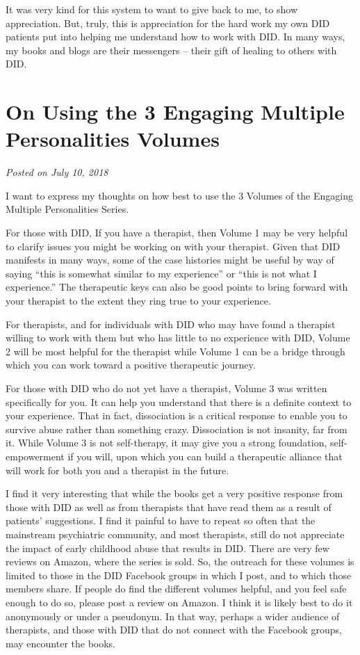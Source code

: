 \documentclass[]{book}
\begin{document}
It was very kind for this system to want to give back to me, to show appreciation. But, truly, this is appreciation for the hard work my own DID patients put into helping me understand how to work with DID. In many ways, my books and blogs are their messengers -- their gift of healing to others with DID.

\hypertarget{on-using-the-3-engaging-multiple-personalities-volumes}{%
\section{On Using the 3 Engaging Multiple Personalities Volumes}\label{on-using-the-3-engaging-multiple-personalities-volumes}}

\emph{Posted on July 10, 2018}

I want to express my thoughts on how best to use the 3 Volumes of the Engaging Multiple Personalities Series.

For those with DID, If you have a therapist, then Volume 1 may be very helpful to clarify issues you might be working on with your therapist. Given that DID manifests in many ways, some of the case histories might be useful by way of saying ``this is somewhat similar to my experience'' or ``this is not what I experience.'' The therapeutic keys can also be good points to bring forward with your therapist to the extent they ring true to your experience.

For therapists, and for individuals with DID who may have found a therapist willing to work with them but who has little to no experience with DID, Volume 2 will be most helpful for the therapist while Volume 1 can be a bridge through which you can work toward a positive therapeutic journey.

For those with DID who do not yet have a therapist, Volume 3 was written specifically for you. It can help you understand that there is a definite context to your experience. That in fact, dissociation is a critical response to enable you to survive abuse rather than something crazy. Dissociation is not insanity, far from it. While Volume 3 is not self-therapy, it may give you a strong foundation, self-empowerment if you will, upon which you can build a therapeutic alliance that will work for both you and a therapist in the future.

I find it very interesting that while the books get a very positive response from those with DID as well as from therapists that have read them as a result of patients' suggestions. I find it painful to have to repeat so often that the mainstream psychiatric community, and most therapists, still do not appreciate the impact of early childhood abuse that results in DID.
There are very few reviews on Amazon, where the series is sold. So, the outreach for these volumes is limited to those in the DID Facebook groups in which I post, and to which those members share. If people do find the different volumes helpful, and you feel safe enough to do so, please post a review on Amazon. I think it is likely best to do it anonymously or under a pseudonym. In that way, perhaps a wider audience of therapists, and those with DID that do not connect with the Facebook groups, may encounter the books.
\end{document}
